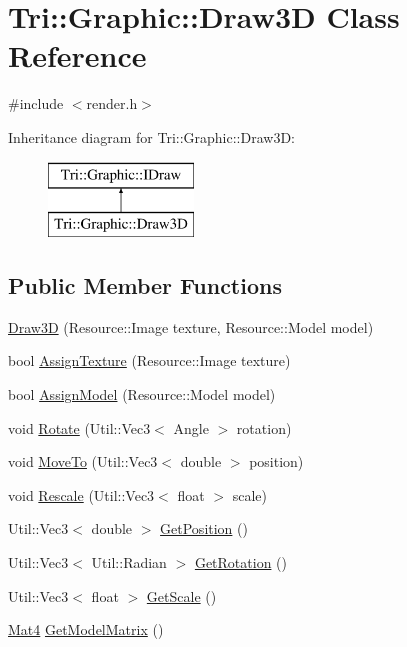 \hypertarget{class_tri_1_1_graphic_1_1_draw3_d}{}\section{Tri\+:\+:Graphic\+:\+:Draw3\+D Class Reference}
\label{class_tri_1_1_graphic_1_1_draw3_d}


{\ttfamily \#include $<$render.\+h$>$}

Inheritance diagram for Tri\+:\+:Graphic\+:\+:Draw3\+D\+:\begin{figure}[H]
\begin{center}
\leavevmode
\includegraphics[height=2.000000cm]{class_tri_1_1_graphic_1_1_draw3_d}
\end{center}
\end{figure}
\subsection*{Public Member Functions}
\begin{DoxyCompactItemize}
\item 
\hyperlink{class_tri_1_1_graphic_1_1_draw3_d_a484cb66283010d4753461707fa0cbee0}{Draw3\+D} (Resource\+::\+Image texture, Resource\+::\+Model model)
\item 
bool \hyperlink{class_tri_1_1_graphic_1_1_draw3_d_a0a51e5e9ce64c32fd34572bca25151d8}{Assign\+Texture} (Resource\+::\+Image texture)
\item 
bool \hyperlink{class_tri_1_1_graphic_1_1_draw3_d_a7a8cad2d1fe74bb22dec83257ee6dba8}{Assign\+Model} (Resource\+::\+Model model)
\item 
void \hyperlink{class_tri_1_1_graphic_1_1_draw3_d_a2918187361ba98fe0495526e3f6d7637}{Rotate} (Util\+::\+Vec3$<$ Angle $>$ rotation)
\item 
void \hyperlink{class_tri_1_1_graphic_1_1_draw3_d_a72b1738a37ee3103794293baa513cdfb}{Move\+To} (Util\+::\+Vec3$<$ double $>$ position)
\item 
void \hyperlink{class_tri_1_1_graphic_1_1_draw3_d_a6b1edf2afb23174b24f4896f1596b848}{Rescale} (Util\+::\+Vec3$<$ float $>$ scale)
\item 
Util\+::\+Vec3$<$ double $>$ \hyperlink{class_tri_1_1_graphic_1_1_draw3_d_a893a85143357d9e0635cee5ec0ce33ea}{Get\+Position} ()
\item 
Util\+::\+Vec3$<$ Util\+::\+Radian $>$ \hyperlink{class_tri_1_1_graphic_1_1_draw3_d_a0bed6e0fc43eedd53e1624c62d5e6a0d}{Get\+Rotation} ()
\item 
Util\+::\+Vec3$<$ float $>$ \hyperlink{class_tri_1_1_graphic_1_1_draw3_d_a0ecf83003607b789ab22613ccc5651cc}{Get\+Scale} ()
\item 
\hyperlink{namespace_tri_1_1_graphic_a7b3538cdaff9bf96489c56a4f48a5f9a}{Mat4} \hyperlink{class_tri_1_1_graphic_1_1_draw3_d_a32ab7b7f0f956c0058a4a24a20ff4efc}{Get\+Model\+Matrix} ()
\end{DoxyCompactItemize}
